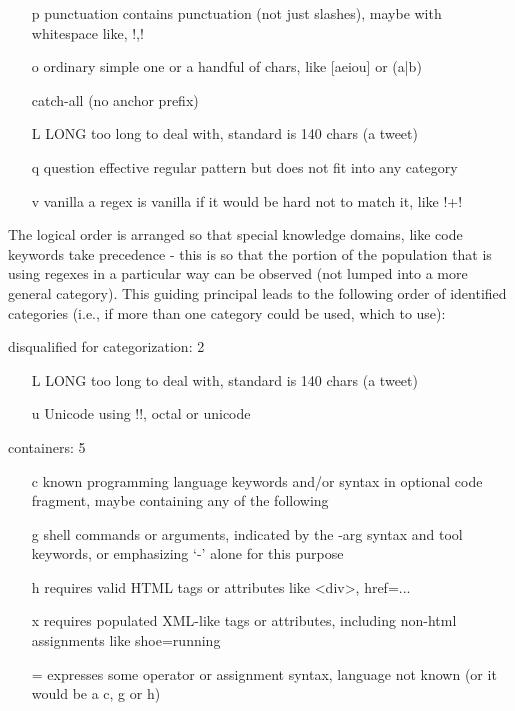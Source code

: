 \begin{itemize}
\item[ p ] punctuation   contains punctuation (not just slashes), maybe with whitespace like, \cverb!\s*,\s*!
\item[ o ] ordinary         simple one or a handful of chars, like [aeiou] or (a|b)


catch-all (no anchor prefix)
\item[ L ] LONG        too long to deal with, standard is 140 chars (a tweet)
\item[ q ] question    effective regular pattern but does not fit into any category
\item[ v ] vanilla     a regex is vanilla if it would be hard not to match it, like \cverb!\w+!
\end{itemize}

The logical order is arranged so that special knowledge domains, like code keywords take precedence - this is so that the portion of the population that is using regexes in a particular way can be observed (not lumped into a more general category).  This guiding principal leads to the following order of identified categories (i.e., if more than one category could be used, which to use):

disqualified for categorization: 2
\begin{itemize}
\item[ L ] LONG        too long to deal with, standard is 140 chars (a tweet)
\item[ u ] Unicode          using \cverb!\x[a-f0-9][a-f0-9]!, octal or unicode
\end{itemize}

containers: 5
\begin{itemize}
\item[ c ] known programming language keywords and/or syntax in optional code fragment, maybe containing any of the following
\item[ g ] shell commands or arguments, indicated by the -arg syntax and tool keywords, or emphasizing `-' alone for this purpose
\item[ h ] requires valid HTML tags or attributes like <div>,  href=...
\item[ x ] requires populated XML-like tags or attributes, including non-html assignments like shoe=running
\item[ = ] expresses some operator or assignment syntax, language not known (or it would be a c, g or h)
\end{itemize}

